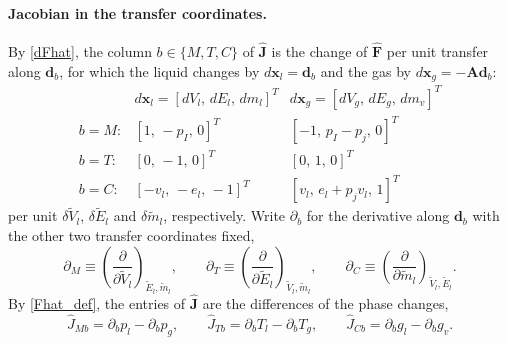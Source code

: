 \paragraph{Jacobian in the transfer coordinates.}
By \eqref{dFhat}, the column $b\in\{M,T,C\}$ of $\hat{\boldsymbol{J}}$ is the change of $\hat{\boldsymbol{F}}$ per unit transfer along $\boldsymbol{d}_b$, for which the liquid changes by $d\boldsymbol{x}_l=\boldsymbol{d}_b$ and the gas by $d\boldsymbol{x}_g=-\boldsymbol{A}\boldsymbol{d}_b$:
\begin{equation}\label{dirs_lg}
\begin{array}{lll}
 & d\boldsymbol{x}_l=[dV_l,\,dE_l,\,dm_l]^T & d\boldsymbol{x}_g=[dV_g,\,dE_g,\,dm_v]^T\\[2pt]
b=M: & [1,\,-p_I,\,0]^T & [-1,\,p_I-p_{j},\,0]^T\\
b=T: & [0,\,-1,\,0]^T & [0,\,1,\,0]^T\\
b=C: & [-v_l,\,-e_l,\,-1]^T & [v_l,\,e_l+p_{j}v_l,\,1]^T
\end{array}
\end{equation}
per unit $\delta\tilde{V}_l$, $\delta\tilde{E}_l$ and $\delta\tilde{m}_l$, respectively. Write $\partial_b$ for the derivative along $\boldsymbol{d}_b$ with the other two transfer coordinates fixed,
\begin{equation}
\partial_M\equiv\left(\frac{\partial}{\partial\tilde{V}_l}\right)_{\tilde{E}_l,\tilde{m}_l},\qquad
\partial_T\equiv\left(\frac{\partial}{\partial\tilde{E}_l}\right)_{\tilde{V}_l,\tilde{m}_l},\qquad
\partial_C\equiv\left(\frac{\partial}{\partial\tilde{m}_l}\right)_{\tilde{V}_l,\tilde{E}_l}.
\end{equation}
By \eqref{Fhat_def}, the entries of $\hat{\boldsymbol{J}}$ are the differences of the phase changes,
\begin{equation}\label{J_cols}
\hat{J}_{Mb}=\partial_bp_l-\partial_bp_g,\qquad \hat{J}_{Tb}=\partial_bT_l-\partial_bT_g,\qquad \hat{J}_{Cb}=\partial_bg_l-\partial_bg_v .
\end{equation}

